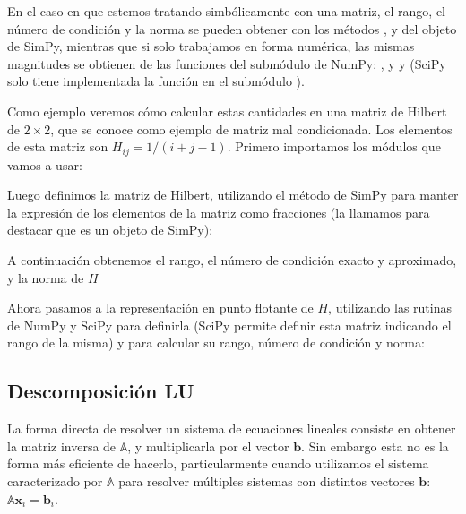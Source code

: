 En el caso en que estemos tratando simbólicamente con una matriz, el rango, el número de condición y la norma se pueden obtener con los métodos ,  y  del objeto  de SimPy, mientras que si solo trabajamos en forma numérica, las mismas magnitudes se obtienen de las funciones del submódulo  de NumPy: , y  y  (SciPy solo tiene implementada la función  en el submódulo ).

Como ejemplo veremos cómo calcular estas cantidades en una matriz de Hilbert de $2 \times 2$, que se conoce como ejemplo de matriz mal condicionada. Los elementos de esta matriz son $H_{ij} = 1 / (i+j-1)$. Primero importamos los módulos que vamos a usar:

Luego definimos la matriz de Hilbert, utilizando el método  de SimPy para manter la expresión de los elementos de la matriz como fracciones (la llamamos  para destacar que es un objeto  de SimPy):

A continuación obtenemos el rango, el número de condición exacto y aproximado, y la norma de $H$

Ahora pasamos a la representación en punto flotante de $H$, utilizando las rutinas de NumPy y SciPy para definirla (SciPy permite definir esta matriz indicando el rango de la misma) y para calcular su rango, número de condición y norma:

\subsection{Descomposición LU}

La forma directa de resolver un sistema de ecuaciones lineales consiste en obtener la matriz inversa de $\mathbb{A}$, y multiplicarla por el vector $\bm{b}$. Sin embargo esta no es la forma más eficiente de hacerlo, particularmente cuando utilizamos el sistema caracterizado por $\mathbb{A}$ para resolver múltiples sistemas con distintos vectores $\bm{b}$:  $\mathbb{A} \bm{x}_i = \bm{b}_i$. 

